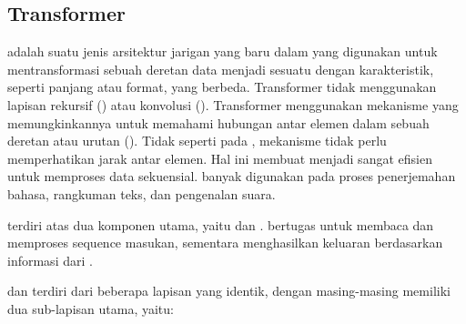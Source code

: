 \subsection{Transformer}
\label{subsec:transformer}

\transformer{} adalah suatu jenis arsitektur jarigan yang baru dalam \dl{} yang digunakan untuk mentransformasi sebuah deretan data menjadi sesuatu dengan karakteristik, seperti panjang atau format, yang berbeda. Transformer tidak menggunakan lapisan rekursif (\rnn) atau konvolusi (\cnn).  Transformer menggunakan mekanisme \selfattention{} yang memungkinkannya untuk memahami hubungan antar elemen dalam sebuah deretan atau urutan
(\sequence). Tidak seperti pada \rnn{}, mekanisme \selfattention tidak perlu memperhatikan jarak antar elemen. Hal ini membuat \transformer{} menjadi sangat efisien untuk memproses data sekuensial. \transformer{} banyak digunakan pada proses penerjemahan bahasa, rangkuman teks, dan pengenalan suara.

\transformer{} terdiri atas dua komponen utama, yaitu \encoder{} dan \decoder. \encoderfl{} bertugas untuk membaca dan memproses sequence masukan, sementara \decoder{} menghasilkan \sequence{} keluaran berdasarkan informasi dari \encoder.

\encoderfl{} dan \decoder{} terdiri dari beberapa lapisan yang identik, dengan masing-masing memiliki dua sub-lapisan utama, yaitu:


